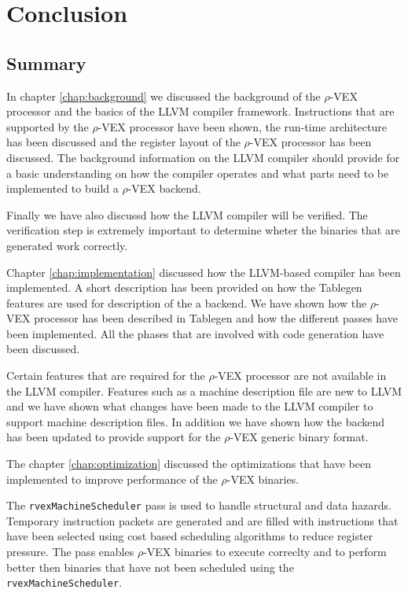 \chapter{Conclusion}
\label{chap:conclusion}

\section{Summary}
In chapter \ref{chap:background} we discussed the background of the $\rho$-VEX processor and the basics of the LLVM compiler framework. Instructions that are supported by the $\rho$-VEX processor have been shown, the run-time architecture has been discussed and the register layout of the $\rho$-VEX processor has been discussed. The background information on the LLVM compiler should provide for a basic understanding on how the compiler operates and what parts need to be implemented to build a $\rho$-VEX backend.

Finally we have also discussd how the LLVM compiler will be verified. The verification step is extremely important to determine wheter the binaries that are generated work correctly.

Chapter \ref{chap:implementation} discussed how the LLVM-based compiler has been implemented. A short description has been provided on how the Tablegen features are used for description of the a backend. We have shown how the $\rho$-VEX processor has been described in Tablegen and how the different passes have been implemented. All the phases that are involved with code generation have been discussed.

Certain features that are required for the $\rho$-VEX processor are not available in the LLVM compiler. Features such as a machine description file are new to LLVM and we have shown what changes have been made to the LLVM compiler to support machine description files. In addition we have shown how the backend has been updated to provide support for the $\rho$-VEX generic binary format.

The chapter \ref{chap:optimization} discussed the optimizations that have been implemented to improve performance of the $\rho$-VEX binaries.

The \texttt{rvexMachineScheduler} pass is used to handle structural and data hazards. Temporary instruction packets are generated and are filled with instructions that have been selected using cost based scheduling algorithms to reduce register pressure. The pass enables $\rho$-VEX binaries to execute correclty and to perform better then binaries that have not been scheduled using the \texttt{rvexMachineScheduler}.

